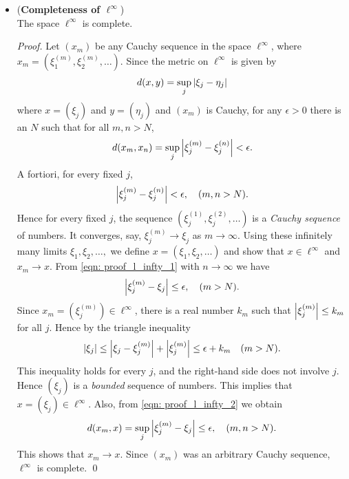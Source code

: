 \documentclass[11pt]{article}
\begin{document}
\begin{itemize}
\item \begin{proposition} (\textbf{Completeness of $\ell^{\infty}$})\\
The space $\ell^{\infty}$ is complete.
\end{proposition}
\begin{proof}
Let $(x_m)$ be any Cauchy sequence in the space  $\ell^{\infty}$, where $x_m = (\xi_1^{(m)}, \xi_2^{(m)}, \ldots)$. Since the metric on $\ell^{\infty}$ is given by
\begin{align*}
d(x, y) = \sup_{j}\left\lvert \xi_j - \eta_j \right\rvert
\end{align*} where $x = (\xi_j)$ and $y = (\eta_j)$ and $(x_m)$ is Cauchy, for any $\epsilon > 0$ there is an $N$ such that for all $m, n > N$,
\begin{align*}
d(x_m, x_n) = \sup_{j}\left\lvert \xi_j^{(m)} - \xi_j^{(n)} \right\rvert < \epsilon.
\end{align*}
A fortiori, for every fixed $j$,
\begin{align}
\left\lvert \xi_j^{(m)} - \xi_j^{(n)} \right\rvert < \epsilon, \quad (m,n>N). \label{eqn: proof_l_infty_1}
\end{align}
Hence for every fixed $j$, the sequence $(\xi_j^{(1)}, \xi_j^{(2)}, \ldots)$ is a \emph{Cauchy sequence} of numbers. It converges, say, $\xi_j^{(m)} \rightarrow \xi_j$ as $m \rightarrow \infty$. Using these infinitely many limits  $\xi_1, \xi_2, \ldots,$  we define $x = (\xi_1, \xi_2, \ldots)$ and show that $x \in \ell^{\infty}$ and $x_m \rightarrow x$. From \eqref{eqn: proof_l_infty_1} with $n \rightarrow \infty$ we have
\begin{align}
\left\lvert \xi_j^{(m)} - \xi_j \right\rvert \le \epsilon, \quad (m >N). \label{eqn: proof_l_infty_2}
\end{align}
Since $x_m = (\xi_j^{(m)}) \in \ell^{\infty}$, there is a real number $k_m$ such that $\left\lvert \xi_j^{(m)} \right\rvert \le k_m$ for all $j$.
Hence by the triangle inequality
\begin{align*}
\left\lvert \xi_j \right\rvert \le \left\lvert  \xi_j - \xi_j^{(m)} \right\rvert + \left\lvert \xi_j^{(m)} \right\rvert \le \epsilon + k_m \quad (m >N).
\end{align*}
This inequality holds for every $j$, and the right-hand side does not involve $j$. Hence $(\xi_{j})$ is a \emph{bounded} sequence of numbers. This implies
that $x = (\xi_j) \in \ell^{\infty}$.  Also, from \eqref{eqn: proof_l_infty_2} we obtain
\begin{align*}
d(x_m, x) = \sup_{j}\left\lvert \xi_j^{(m)} - \xi_j \right\rvert \le \epsilon, \quad (m,n>N). 
\end{align*}
This shows that $x_m \rightarrow x$. Since $(x_m)$ was an arbitrary Cauchy sequence, $\ell^{\infty}$ is complete. \qed
\end{proof}


\end{itemize}
\end{document}
